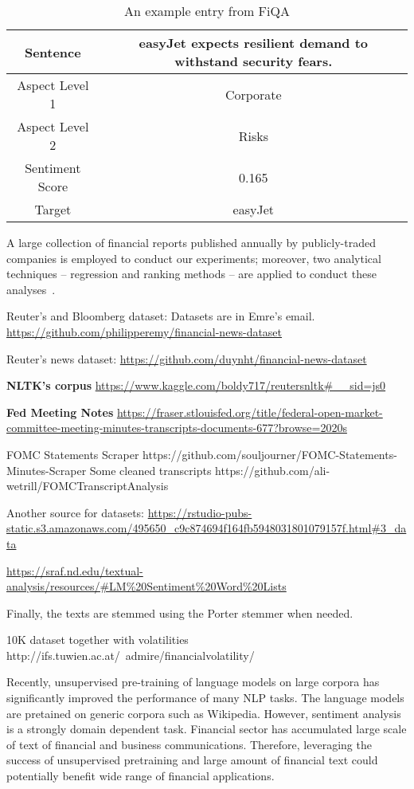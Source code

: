 \documentclass[11pt]{article}
\begin{document}
\begin{table}
  \begin{tabular}{|c|c|}
    \hline 
 Sentence & easyJet expects resilient demand to withstand security
            fears. \\ \hline
Aspect Level 1 &  Corporate \\ \hline 
Aspect Level 2 & Risks \\ \hline 
Sentiment Score & 0.165 \\ \hline 
Target & easyJet \\ \hline 
\end{tabular}
\caption{An example entry from FiQA}
\label{tab:fiqa_example}
\end{table}

A large collection of financial reports published annually by publicly-traded companies is employed to conduct our experiments;
moreover, two analytical techniques – regression and ranking methods –
are applied to conduct these analyses~\cite{xxx}.

Reuter's and Bloomberg dataset: Datasets are in Emre's email.
\url{https://github.com/philipperemy/financial-news-dataset}

Reuter's news dataset:
\url{https://github.com/duynht/financial-news-dataset}

\textbf{NLTK's corpus}
\url{https://www.kaggle.com/boldy717/reutersnltk#__sid=js0}

\textbf{Fed Meeting Notes}
\url{https://fraser.stlouisfed.org/title/federal-open-market-committee-meeting-minutes-transcripts-documents-677?browse=2020s}

FOMC Statements Scraper
https://github.com/souljourner/FOMC-Statements-Minutes-Scraper
Some cleaned transcripts
https://github.com/ali-wetrill/FOMCTranscriptAnalysis

Another source for datasets: \url{https://rstudio-pubs-static.s3.amazonaws.com/495650_c9c874694f164fb5948031801079157f.html#3_data}

\url{https://sraf.nd.edu/textual-analysis/resources/#LM%20Sentiment%20Word%20Lists}

Finally, the texts are stemmed using the Porter stemmer when needed.

10K dataset together with volatilities
http://ifs.tuwien.ac.at/~admire/financialvolatility/


Recently, unsupervised pre-training of language models on large corpora has significantly improved the performance of many NLP tasks. The
language models are pretained on generic corpora such as Wikipedia. However, sentiment analysis
is a strongly domain dependent task. Financial sector has accumulated large scale of text of financial and business communications. Therefore,
leveraging the success of unsupervised pretraining and large amount of
financial text could potentially benefit wide range of financial applications.
\end{document}
